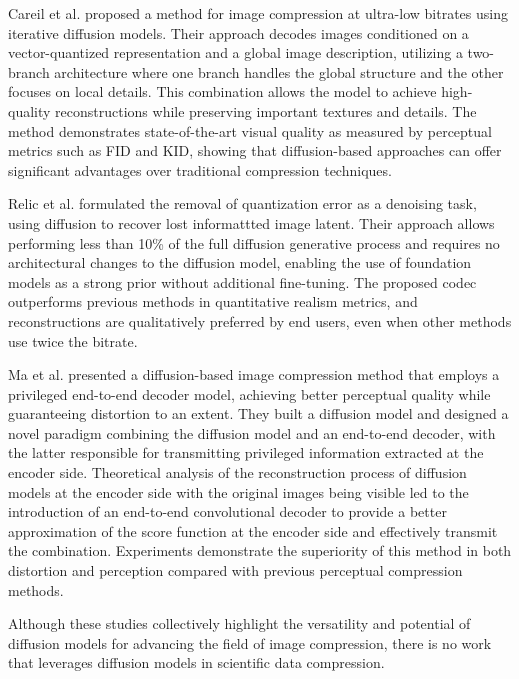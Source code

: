 Careil et al. \cite{Careil2024towards} proposed a method for image compression at ultra-low bitrates using iterative diffusion models. Their approach decodes images conditioned on a vector-quantized representation and a global image description, utilizing a two-branch architecture where one branch handles the global structure and the other focuses on local details. This combination allows the model to achieve high-quality reconstructions while preserving important textures and details. The method demonstrates state-of-the-art visual quality as measured by perceptual metrics such as FID and KID, showing that diffusion-based approaches can offer significant advantages over traditional compression techniques.

Relic et al. \cite{Relic2024lossy} formulated the removal of quantization error as a denoising task, using diffusion to recover lost informattted image latent. Their approach allows performing less than 10\% of the full diffusion generative process and requires no architectural changes to the diffusion model, enabling the use of foundation models as a strong prior without additional fine-tuning. The proposed codec outperforms previous methods in quantitative realism metrics, and reconstructions are qualitatively preferred by end users, even when other methods use twice the bitrate.

Ma et al. \cite{ma2024correcting} presented a diffusion-based image compression method that employs a privileged end-to-end decoder model, achieving better perceptual quality while guaranteeing distortion to an extent. They built a diffusion model and designed a novel paradigm combining the diffusion model and an end-to-end decoder, with the latter responsible for transmitting privileged information extracted at the encoder side. Theoretical analysis of the reconstruction process of diffusion models at the encoder side with the original images being visible led to the introduction of an end-to-end convolutional decoder to provide a better approximation of the score function at the encoder side and effectively transmit the combination. Experiments demonstrate the superiority of this method in both distortion and perception compared with previous perceptual compression methods.

Although these studies collectively highlight the versatility and potential of diffusion models for advancing the field of image compression, there is no work that leverages diffusion models in scientific data compression.
